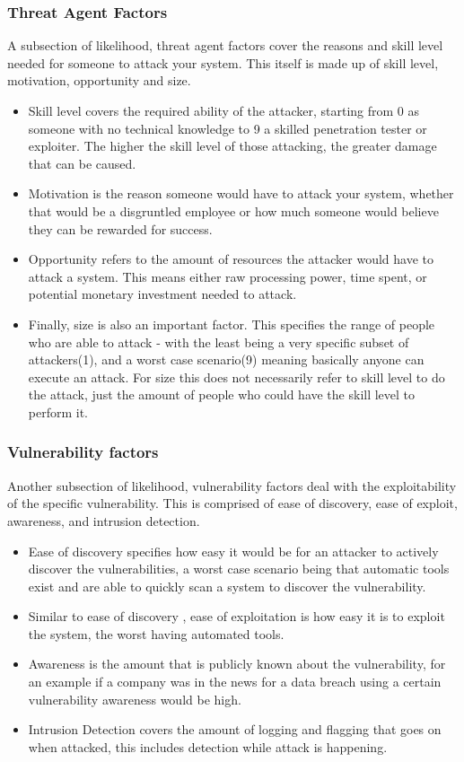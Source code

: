 \documentclass{report}
\begin{document}
\subsubsection{Threat Agent Factors}
A subsection of likelihood, threat agent factors cover the reasons and skill level needed for someone to attack your system. This itself is made up of skill level, motivation, opportunity and size.\\
\begin{itemize}
	\item Skill level covers the required ability of the attacker, starting from 0 as someone with no technical knowledge to 9 a skilled penetration tester or exploiter. The higher the skill level of those attacking, the greater damage that can be caused.
	\item Motivation is the reason someone would have to attack your system, whether that would be a disgruntled employee or how much someone would believe they can be rewarded for success.
	\item Opportunity refers to the amount of resources the attacker would have to attack a system. This means either raw processing power, time spent, or potential monetary investment needed to attack.
	\item Finally, size is also an important factor. This specifies the range of people who are able to attack - with the least being a very specific subset of attackers(1), and a worst case scenario(9) meaning basically anyone can execute an attack. For size this does not necessarily refer to skill level to do the attack, just the amount of people who could have the skill level to perform it.
\end{itemize}

\subsubsection{Vulnerability factors}
Another subsection of likelihood, vulnerability factors deal with the exploitability of the specific vulnerability. This is comprised of ease of discovery, ease of exploit, awareness, and intrusion detection.
\begin{itemize}
	\item Ease of discovery specifies how easy it would be for an attacker to actively discover the vulnerabilities, a worst case scenario being that automatic tools exist and are able to quickly scan a system to discover the vulnerability.
	\item Similar to ease of discovery , ease of exploitation is how easy it is to exploit the system, the worst having automated tools.
	\item Awareness is the amount that is publicly known about the vulnerability, for an example if a company was in the news for a data breach using a certain vulnerability awareness would be high.
	\item Intrusion Detection covers the amount of logging and flagging that goes on when attacked, this includes detection while attack is happening.
\end{itemize}
\end{document}
